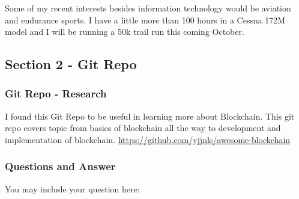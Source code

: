Some of my recent interests besides information technology would be aviation and endurance sports. I have a little more than 100 hours in a Cessna 172M model and I will be running a 50k trail run this coming October.

\subsection{Section 2 - Git Repo}

\subsubsection{Git Repo - Research}
I found this Git Repo to be useful in learning more about Blockchain. This git repo covers topic from basics of blockchain all the way to development and implementation of blockchain.
\url{https://github.com/yjjnls/awesome-blockchain}


\subsubsection{Questions and Answer} 
You may include your question here:
